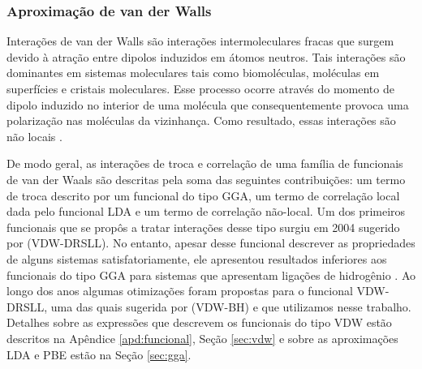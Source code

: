 

\subsubsection{Aproximação de van der Walls}\label{vdw}

Interações de van der Walls são interações intermoleculares fracas que surgem devido à atração entre dipolos induzidos em átomos neutros. Tais interações são dominantes em sistemas moleculares tais como biomoléculas, moléculas em superfícies e cristais moleculares. Esse processo ocorre através do momento de dipolo induzido no interior de uma molécula que consequentemente provoca uma polarização nas moléculas da vizinhança. Como resultado, essas interações são não locais \cite{article_vdw}.  

De modo geral, as interações de troca e correlação de uma família de funcionais de van der Waals são descritas pela soma das seguintes contribuições: um termo de troca descrito por um funcional do tipo GGA, um termo de correlação local dada pelo funcional LDA e um termo de correlação não-local. Um dos primeiros funcionais que se propôs a tratar interações desse tipo surgiu em 2004 sugerido por \citeauthor{DRSLL} (VDW-DRSLL). No entanto, apesar desse funcional descrever as propriedades de alguns sistemas satisfatoriamente, ele apresentou resultados inferiores aos funcionais do tipo GGA para sistemas que apresentam ligações de hidrogênio \cite{vdw_solidos}. Ao longo dos anos algumas otimizações foram propostas para o funcional VDW-DRSLL, uma das quais sugerida por \citeauthor{vdw-bh} (VDW-BH) e que utilizamos nesse trabalho. Detalhes sobre as expressões que descrevem os funcionais do tipo VDW estão descritos na Apêndice \ref{apd:funcional}, Seção \ref{sec:vdw} e sobre as aproximações LDA e PBE estão na Seção \ref{sec:gga}.

